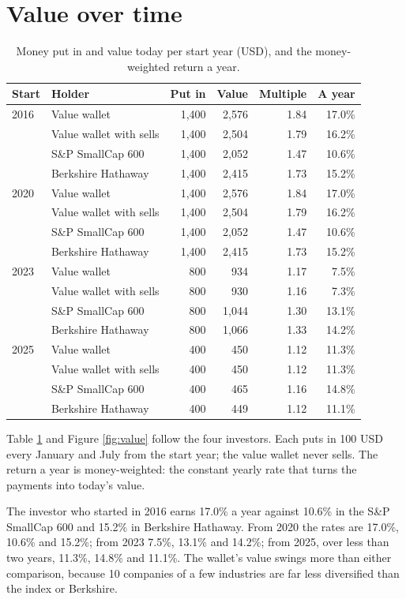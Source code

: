 \documentclass[11pt,a4paper]{article}
\begin{document}
\section{Value over time}
\begin{table}[H]
\centering
\small
\caption{Money put in and value today per start year (USD), and the money-weighted return a year.}\label{tab:value}
\begin{tabular}{l l r r r r}
\hline
Start & Holder & Put in & Value & Multiple & A year \\
\hline
2016 & Value wallet & 1,400 & 2,576 & 1.84 & 17.0\% \\
 & Value wallet with sells & 1,400 & 2,504 & 1.79 & 16.2\% \\
 & S\&P SmallCap 600 & 1,400 & 2,052 & 1.47 & 10.6\% \\
 & Berkshire Hathaway & 1,400 & 2,415 & 1.73 & 15.2\% \\
\hline
2020 & Value wallet & 1,400 & 2,576 & 1.84 & 17.0\% \\
 & Value wallet with sells & 1,400 & 2,504 & 1.79 & 16.2\% \\
 & S\&P SmallCap 600 & 1,400 & 2,052 & 1.47 & 10.6\% \\
 & Berkshire Hathaway & 1,400 & 2,415 & 1.73 & 15.2\% \\
\hline
2023 & Value wallet & 800 & 934 & 1.17 & 7.5\% \\
 & Value wallet with sells & 800 & 930 & 1.16 & 7.3\% \\
 & S\&P SmallCap 600 & 800 & 1,044 & 1.30 & 13.1\% \\
 & Berkshire Hathaway & 800 & 1,066 & 1.33 & 14.2\% \\
\hline
2025 & Value wallet & 400 & 450 & 1.12 & 11.3\% \\
 & Value wallet with sells & 400 & 450 & 1.12 & 11.3\% \\
 & S\&P SmallCap 600 & 400 & 465 & 1.16 & 14.8\% \\
 & Berkshire Hathaway & 400 & 449 & 1.12 & 11.1\% \\
\hline
\end{tabular}
\end{table}
Table \ref{tab:value} and Figure \ref{fig:value} follow the four investors. Each puts in 100 USD every January and July from the start year; the value wallet never sells. The return a year is money-weighted: the constant yearly rate that turns the payments into today's value.

The investor who started in 2016 earns 17.0\% a year against 10.6\% in the S\&P SmallCap 600 and 15.2\% in Berkshire Hathaway. From 2020 the rates are 17.0\%, 10.6\% and 15.2\%; from 2023 7.5\%, 13.1\% and 14.2\%; from 2025, over less than two years, 11.3\%, 14.8\% and 11.1\%. The wallet's value swings more than either comparison, because 10 companies of a few industries are far less diversified than the index or Berkshire.
\end{document}
